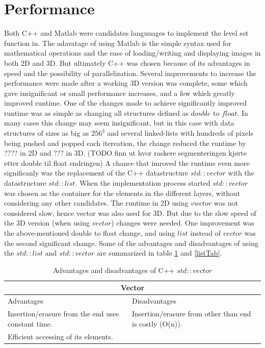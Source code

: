 \section{Performance}
Both C++ and Matlab were candidates languuages to implement the level set function in. The adavatage of using Matlab is the simple syntax used for mathematical operations and the ease of loading/writing and displaying images in both 2D and 3D. But ultimately C++ was chosen because of its advantages in speed and the possibility of parallelization.
Several improvements to increase the performance were made after a working 3D version was complete, some which gave insignificant or small performance increases, and a few which greatly improved runtime. One of the changes made to achieve significantly improved runtime was as simple as changing all structures defined as $double$ to $float$. In many cases this change may seem insignificant, but in this case with data structures of sizes as big as $256^3$ and several linked-lists with hundreds of pixels being pushed and popped each itereation, the change reduced the runtime by ???? in 2D and ??? in 3D. (TODO finn ut hvor raskere segmenteringen kjørte etter double til float endringen) A chance that imroved the runtime even more significanly was the replacement of the C++ datastructure $std::vector$ with the datastructure $std::list$. When the implementation process started $std::vector$ was chosen as the container for the elements in the different layers, without considering any other candidates. The runtime in 2D using $vwctor$ was not considered slow, hence vector was also used for 3D. But due to the slow speed of the 3D version (when using $vector$) changes were needed. One improvement was the above-mentioned double to float change, and using $list$ instead of $vector$ was the second significant change. Some of the advantages and disadvantages of using the $std::list$ and $std::vector$ are summarized in table \ref{vectorTab} and \ref{listTab}.

\begin{table}[h!]
	\begin{tabular}{| p{5.85cm} | p{5.85cm} |} 
	\hline
	\multicolumn{2}{|c|}{Vector} \\
	\hline
	Advantages & Disadvantages \\
	\hline
	Insertion/erasure from the end uses constant time. &  Insertion/erasure from other than end is costly (O(n)). \\
	Efficient accessing of its elements. & \\
	\hline
	\end{tabular}
	\caption{Advantages and disadvantages of C++ $std::vector$}
	\label{vectorTab}
\end{table}

